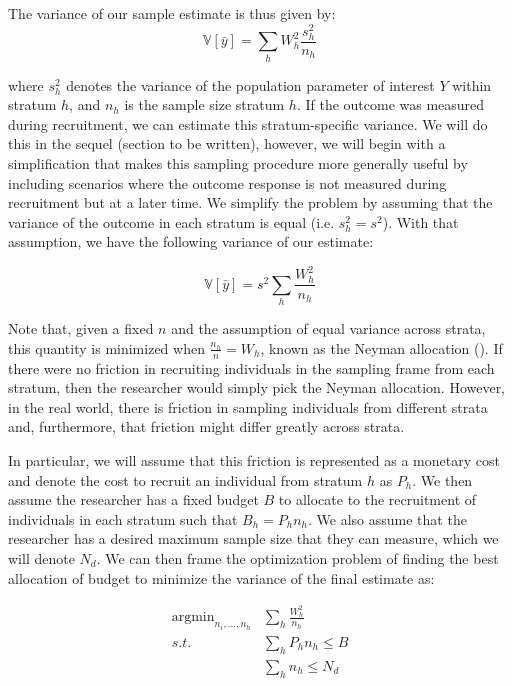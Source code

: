 \documentclass[a4paper,12pt]{article}
\theoremstyle{proposition}
\DeclareMathOperator*{\argmin}{argmin}
\begin{document}




The variance of our sample estimate is thus given by:
$$
\mathbb{V}[\bar{y}] =  \sum_{h}  W_h^2 \frac{s_h^2}{n_h}
$$


where $s_h^2$ denotes the variance of the population parameter of interest $Y$ within stratum $h$, and $n_h$ is the sample size stratum $h$. If the outcome was measured during recruitment, we can estimate this stratum-specific variance. We will do this in the sequel (section to be written), however, we will begin with a simplification that makes this sampling procedure more generally useful by including scenarios where the outcome response is not measured during recruitment but at a later time. We simplify the problem by assuming that the variance of the outcome in each stratum is equal (i.e. $s_h^2 = s^2$). With that assumption, we have the following variance of our estimate:

$$
\mathbb{V}[\bar{y}] =  s^2  \sum_{h}  \frac{W_h^2}{n_h}
$$

Note that, given a fixed $n$ and the assumption of equal variance across strata, this quantity is minimized when $\frac{n_h}{n} = W_h$, known as the Neyman allocation (\cite{Neyman1934,Groves2010}). If there were no friction in recruiting individuals in the sampling frame from each stratum, then the researcher would simply pick the Neyman allocation. However, in the real world, there is friction in sampling individuals from different strata and, furthermore, that friction might differ greatly across strata.

In particular, we will assume that this friction is represented as a monetary cost and denote the cost to recruit an individual from stratum $h$ as $P_h$. We then assume the researcher has a fixed budget $B$ to allocate to the recruitment of individuals in each stratum such that $B_h = P_hn_h$. We also assume that the researcher has a desired maximum sample size that they can measure, which we will denote $N_d$. We can then frame the optimization problem of finding the best allocation of budget to minimize the variance of the final estimate as:


\begin{align*}
\argmin_{n_i,...,n_h}  &\sum_{h}  \frac{W_h^2}{n_h} \\
s.t. &\sum_h P_hn_h \leq B \\
     &\sum_h n_h \leq N_d
\end{align*}
\end{document}
